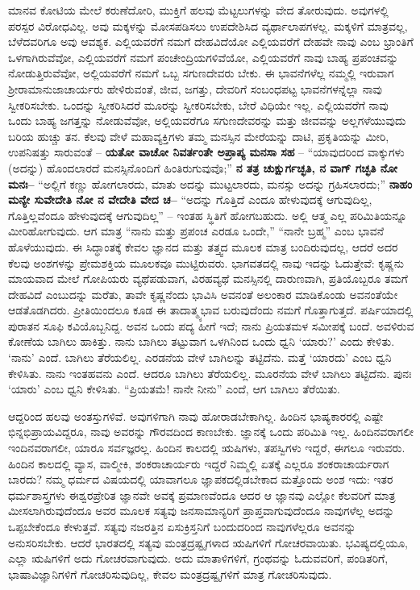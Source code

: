 ಮಾನವ ಕೋಟಿಯ ಮೇಲೆ ಕರುಣೆದೋರಿ, ಮುಕ್ತಿಗೆ ಹಲವು ಮೆಟ್ಟಲುಗಳನ್ನು ವೇದ ತೋರುವುದು. ಅವುಗಳಲ್ಲಿ ಪರಸ್ಪರ ವಿರೋಧವಿಲ್ಲ. ಅವು ಮಕ್ಕಳನ್ನು ಮೋಸಪಡಿಸಲು ಉಪದೇಶಿಸಿದ ವ್ಯರ್ಥಾಲಾಪಗಳಲ್ಲ. ಮಕ್ಕಳಿಗೆ ಮಾತ್ರವಲ್ಲ, ಬೆಳೆದವರಿಗೂ ಅವು ಆವಶ್ಯಕ. ಎಲ್ಲಿಯವರೆಗೆ ನಮಗೆ ದೇಹವಿದೆಯೋ ಎಲ್ಲಿಯವರೆಗೆ ದೇಹವೇ ನಾವು ಎಂಬ ಭ್ರಾಂತಿಗೆ ಒಳಗಾಗಿರುವೆವೋ, ಎಲ್ಲಿಯವರೆಗೆ ನಮಗೆ ಪಂಚೇಂದ್ರಿಯಗಳಿವೆಯೋ, ಎಲ್ಲಿಯವರೆಗೆ ನಾವು ಬಾಹ್ಯ ಪ್ರಪಂಚವನ್ನು ನೋಡುತ್ತಿರುವೆವೋ, ಅಲ್ಲಿಯವರೆಗೆ ನಮಗೆ ಒಬ್ಬ ಸಗುಣದೇವರು ಬೇಕು. ಈ ಭಾವನೆಗಳೆಲ್ಲ ನಮ್ಮಲ್ಲಿ ಇರುವಾಗ ಶ‍್ರೀರಾಮಾನುಜಾಚಾರ್ಯರು ಹೇಳಿರುವಂತೆ, ಜೀವ, ಜಗತ್ತು, ದೇವರಿಗೆ ಸಂಬಂಧಪಟ್ಟ ಭಾವನೆಗಳನ್ನೆಲ್ಲಾ ನಾವು ಸ್ವೀಕರಿಸಬೇಕು. ಒಂದನ್ನು ಸ್ವೀಕರಿಸಿದರೆ ಮೂರನ್ನು ಸ್ವೀಕರಿಸಬೇಕು, ಬೇರೆ ವಿಧಿಯೇ ಇಲ್ಲ. ಎಲ್ಲಿಯವರೆಗೆ ನಾವು ಒಂದು ಬಾಹ್ಯ ಜಗತ್ತನ್ನು ನೋಡುವೆವೋ, ಅಲ್ಲಿಯವರೆಗೂ ಸಗುಣದೇವರನ್ನು ಮತ್ತು ಜೀವವನ್ನು ಅಲ್ಲಗಳೆಯುವುದು ಬರಿಯ ಹುಚ್ಚು ತನ. ಕೆಲವು ವೇಳೆ ಮಹಾವ್ಯಕ್ತಿಗಳು ತಮ್ಮ ಮನಸ್ಸಿನ ಮೇರೆಯನ್ನು ದಾಟಿ, ಪ್ರಕೃತಿಯನ್ನು ಮೀರಿ, ಉಪನಿಷತ್ತು ಸಾರುವಂತೆ – \textbf{ಯತೋ ವಾಚೋ ನಿವರ್ತಂತೇ ಅಪ್ರಾಪ್ಯ ಮನಸಾ ಸಹ} – “ಯಾವುದರಿಂದ ವಾಕ್ಕುಗಳು (ಅದನ್ನು) ಹೊಂದಲಾರದೆ ಮನಸ್ಸಿನೊಂದಿಗೆ ಹಿಂತಿರುಗುವುವೊ;” \textbf{ನ ತತ್ರ ಚುಕ್ಷುರ್ಗಚ್ಛತಿ, ನ ವಾಗ್​ ಗಚ್ಛತಿ ನೋ ಮನಃ–} “ಅಲ್ಲಿಗೆ ಕಣ್ಣು ಹೋಗಲಾರದು, ಮಾತು ಅದನ್ನು ಮುಟ್ಟಲಾರದು, ಮನಸ್ಸು ಅದನ್ನು ಗ್ರಹಿಸಲಾರದು;” \textbf{ನಾಹಂ ಮನ್ಯೇ ಸುವೇದೇತಿ ನೋ ನ ವೇದೇತಿ ವೇದ ಚ–} “ಅದನ್ನು ಗೊತ್ತಿದೆ ಎಂದೂ ಹೇಳುವುದಕ್ಕೆ ಆಗುವುದಿಲ್ಲ, ಗೊತ್ತಿಲ್ಲವೆಂದೂ ಹೇಳುವುದಕ್ಕೆ ಆಗುವುದಿಲ್ಲ” – ಇಂತಹ ಸ್ಥಿತಿಗೆ ಹೋಗಬಹುದು. ಅಲ್ಲಿ ಆತ್ಮ ಎಲ್ಲ ಪರಿಮಿತಿಯನ್ನೂ ಮೀರಿಹೋಗುವುದು. ಆಗ ಮಾತ್ರ “ನಾನು ಮತ್ತು ಪ್ರಪಂಚ ಎರಡೂ ಒಂದೇ,” “ನಾನೇ ಬ್ರಹ್ಮ” ಎಂಬ ಭಾವನೆ ಹೊಳೆಯುವುದು. ಈ ಸಿದ್ಧಾಂತಕ್ಕೆ ಕೇವಲ ಜ್ಞಾನದ ಮತ್ತು ತತ್ತ್ವದ ಮೂಲಕ ಮಾತ್ರ ಬಂದಿರುವುದಲ್ಲ, ಆದರೆ ಅದರ ಕೆಲವು ಅಂಶಗಳನ್ನು ಪ್ರೇಮಶಕ್ತಿಯ ಮೂಲಕವೂ ಮುಟ್ಟಿರುವರು. ಭಾಗವತದಲ್ಲಿ ನಾವು ಇದನ್ನು ಓದುತ್ತೇವೆ: ಕೃಷ್ಣನು ಮಾಯವಾದ ಮೇಲೆ ಗೋಪಿಯರು ವ್ಯಥೆಪಡುವಾಗ, ವಿರಹವ್ಯಥೆ ಮನಸ್ಸಿನಲ್ಲಿ ದಾರುಣವಾಗಿ, ಪ್ರತಿಯೊಬ್ಬರೂ ತಮಗೆ ದೇಹವಿದೆ ಎಂಬುದನ್ನು ಮರೆತು, ತಾವೇ ಕೃಷ್ಣನೆಂದು ಭಾವಿಸಿ ಅವನಂತೆ ಅಲಂಕಾರ ಮಾಡಿಕೊಂಡು ಅವನಂತೆಯೇ ಆಡತೊಡಗಿದರು. ಪ್ರೀತಿಯಿಂದಲೂ ಕೂಡ ಈ ತಾದಾತ್ಮ್ಯಭಾವ ಬರುವುದೆಂದು ನಮಗೆ ಗೊತ್ತಾಗುತ್ತದೆ. ಪರ್ಷಿಯಾದಲ್ಲಿ ಪುರಾತನ ಸೂಫಿ ಕವಿಯೊಬ್ಬನಿದ್ದ. ಅವನ ಒಂದು ಪದ್ಯ ಹೀಗೆ ಇದೆ; ನಾನು ಪ್ರಿಯತಮಳ ಸಮೀಪಕ್ಕೆ ಬಂದೆ. ಅವಳಿರುವ ಕೋಣೆಯ ಬಾಗಿಲು ಹಾಕಿತ್ತು. ನಾನು ಬಾಗಿಲು ತಟ್ಟುವಾಗ ಒಳಗಿನಿಂದ ಒಂದು ಧ್ವನಿ ‘ಯಾರು?’ ಎಂದು ಕೇಳಿತು. ‘ನಾನು’ ಎಂದೆ. ಬಾಗಿಲು ತೆರೆಯಲಿಲ್ಲ. ಎರಡನೆಯ ವೇಳೆ ಬಾಗಿಲನ್ನು ತಟ್ಟಿದೆನು. ಮತ್ತೆ ‘ಯಾರದು’ ಎಂಬ ಧ್ವನಿ ಕೇಳಿಸಿತು. ನಾನು ಇಂತಹವನು ಎಂದೆ. ಆದರೂ ಬಾಗಿಲು ತೆರೆಯಲಿಲ್ಲ. ಮೂರನೆಯ ವೇಳೆ ಬಾಗಿಲು ತಟ್ಟಿದೆನು. ಪುನಃ ‘ಯಾರು’ ಎಂಬ ಧ್ವನಿ ಕೇಳಿಸಿತು. “ಪ್ರಿಯತಮೆ! ನಾನೇ ನೀನು” ಎಂದೆ, ಆಗ ಬಾಗಿಲು ತೆರೆಯಿತು.

ಆದ್ದರಿಂದ ಹಲವು ಅಂತಸ್ತುಗಳಿವೆ. ಅವುಗಳಿಗಾಗಿ ನಾವು ಹೋರಾಡಬೇಕಾಗಿಲ್ಲ. ಹಿಂದಿನ ಭಾಷ್ಯಕಾರರಲ್ಲಿ ಎಷ್ಟೇ ಭಿನ್ನಭಿಪ್ರಾಯವಿದ್ದರೂ, ನಾವು ಅವರನ್ನು ಗೌರವದಿಂದ ಕಾಣಬೇಕು. ಜ್ಞಾನಕ್ಕೆ ಒಂದು ಪರಿಮಿತಿ ಇಲ್ಲ. ಹಿಂದಿನವರಾಗಲೀ ಇಂದಿನವರಾಗಲೀ, ಯಾರೂ ಸರ್ವಜ್ಞರಲ್ಲ. ಹಿಂದಿನ ಕಾಲದಲ್ಲಿ ಋಷಿಗಳು, ತಪಸ್ವಿಗಳು ಇದ್ದರೆ, ಈಗಲೂ ಇರುವರು. ಹಿಂದಿನ ಕಾಲದಲ್ಲಿ ವ್ಯಾಸ, ವಾಲ್ಮೀಕಿ, ಶಂಕರಾಚಾರ್ಯರು ಇದ್ದರೆ ನಿಮ್ಮಲ್ಲಿ ಏತಕ್ಕೆ ಎಲ್ಲರೂ ಶಂಕರಾಚಾರ್ಯರಾಗ ಬಾರದು? ನಮ್ಮ ಧರ್ಮದ ವಿಷಯದಲ್ಲಿ ಯಾವಾಗಲೂ ಜ್ಞಾಪಕದಲ್ಲಿಡಬೇಕಾದ ಮತ್ತೊಂದು ಅಂಶ ಇದು: ಇತರ ಧರ್ಮಶಾಸ್ತ್ರಗಳು ಈಶ್ವರಪ್ರೇರಿತ ಜ್ಞಾನವೇ ಅವಕ್ಕೆ ಪ್ರಮಾಣವೆಂದೂ ಆದರ ಆ ಜ್ಞಾನವು ಎಲ್ಲೋ ಕೆಲವರಿಗೆ ಮಾತ್ರ ಮೀಸಲಾಗಿರುವುದೆಂದೂ ಅವರ ಮೂಲಕ ಸತ್ಯವು ಜನಸಾಮಾನ್ಯರಿಗೆ ಪ್ರಾಪ್ತವಾಗುವುದೆಂದೂ ನಾವುಗಳೆಲ್ಲ ಅದನ್ನು ಒಪ್ಪಬೇಕೆಂದೂ ಕೇಳುತ್ತವೆ. ಸತ್ಯವು ನಜರತ್ತಿನ ಏಸುಕ್ರಿಸ್ತನಿಗೆ ಬಂದುದರಿಂದ ನಾವುಗಳೆಲ್ಲರೂ ಅವನನ್ನು ಅನುಸರಿಸಬೇಕು. ಆದರೆ ಭಾರತದಲ್ಲಿ ಸತ್ಯವು ಮಂತ್ರದ್ರಷ್ಟೃಗಳಾದ ಋಷಿಗಳಿಗೆ ಗೋಚರವಾಯಿತು. ಭವಿಷ್ಯದಲ್ಲಿಯೂ, ಎಲ್ಲಾ ಋಷಿಗಳಿಗೆ ಅದು ಗೋಚರವಾಗುವುದು. ಅದು ಮಾತಾಳಿಗಳಿಗೆ, ಗ್ರಂಥವನ್ನು ಓದುವವರಿಗೆ, ಪಂಡಿತರಿಗೆ, ಭಾಷಾವಿಜ್ಞಾನಿಗಳಿಗೆ ಗೋಚರಿಸುವುದಿಲ್ಲ, ಕೇವಲ ಮಂತ್ರದ್ರಷ್ಟೃಗಳಿಗೆ ಮಾತ್ರ ಗೋಚರಿಸುವುದು.

